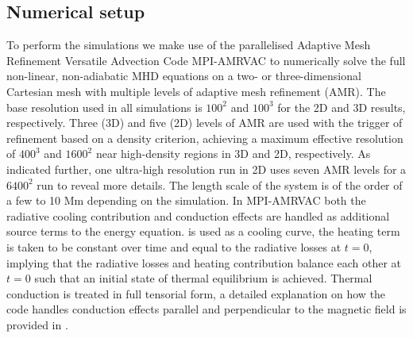 \subsection{Numerical setup}
To perform the simulations we make use of the parallelised Adaptive Mesh Refinement Versatile Advection Code MPI-AMRVAC \citep{keppens2012_amrvac,porth2014_amrvac,xia2018_amrvac} to numerically solve the full non-linear, non-adiabatic MHD equations on a two- or three-dimensional Cartesian mesh with multiple levels of adaptive mesh refinement (AMR). The base resolution used in all simulations is $100^2$ and $100^3$ for the 2D and 3D results, respectively. Three (3D) and five (2D) levels of AMR are used with the trigger of refinement based on a density criterion, achieving a maximum effective resolution of $400^3$ and $1600^2$ near high-density regions in 3D and 2D, respectively. As indicated further, one ultra-high resolution run in 2D uses seven AMR levels for a $6400^2$ run to reveal more details. The length scale of the system is of the order of a few to 10 Mm depending on the simulation. In MPI-AMRVAC both the radiative cooling contribution and conduction effects are handled as additional source terms to the energy equation. \spexdm is used as a cooling curve, the heating term is taken to be constant over time and equal to the radiative losses at $t = 0$, implying that the radiative losses and heating contribution balance each other at $t = 0$ such that an initial state of thermal equilibrium is achieved. Thermal conduction is treated in full tensorial form, a detailed explanation on how the code handles conduction effects parallel and perpendicular to the magnetic field is provided in \citet{xia2018_amrvac}.

